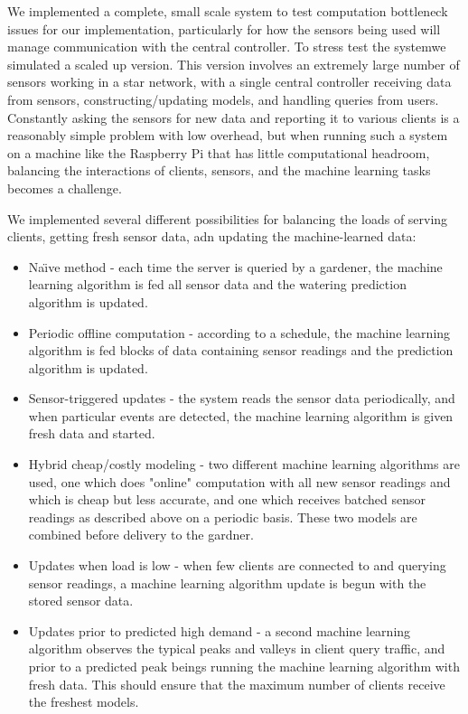 \documentclass[a4paper]{article}
\begin{document}
We implemented a complete, small scale system to test computation bottleneck issues for our implementation, particularly for how the sensors being used will manage communication with the central controller. To stress test the systemwe simulated a scaled up version. This version involves an extremely large number of sensors working in a star network, with a single central controller receiving data from sensors, constructing/updating models, and handling queries from users.  Constantly asking the sensors for new data and reporting it to various clients is a reasonably simple problem with low overhead, but when running such a system on a machine like the Raspberry Pi that has little computational headroom, balancing the interactions of clients, sensors, and the machine learning tasks becomes a challenge.

We implemented several different possibilities for balancing the loads of serving clients, getting fresh sensor data, adn updating the machine-learned data:

\begin{itemize}

\item Na\"{\i}ve method - each time the server is queried by a gardener, the machine learning algorithm is fed all sensor data and the watering prediction algorithm is updated.

\item Periodic offline computation - according to a schedule, the machine learning algorithm is fed blocks of data containing sensor readings and the prediction algorithm is updated.

\item Sensor-triggered updates - the system reads the sensor data periodically, and when particular events are detected, the machine learning algorithm is given fresh data and started.

\item Hybrid cheap/costly modeling - two different machine learning algorithms are used, one which does "online" computation with all new sensor readings and which is cheap but less accurate, and one which receives batched sensor readings as described above on a periodic basis.  These two models are combined before delivery to the gardner.

\item Updates when load is low - when few clients are connected to and querying sensor readings, a machine learning algorithm update is begun with the stored sensor data.

\item Updates prior to predicted high demand - a second machine learning algorithm observes the typical peaks and valleys in client query traffic, and prior to a predicted peak beings running the machine learning algorithm with fresh data.  This should ensure that the maximum number of clients receive the freshest models.

\end{itemize}
\end{document}
